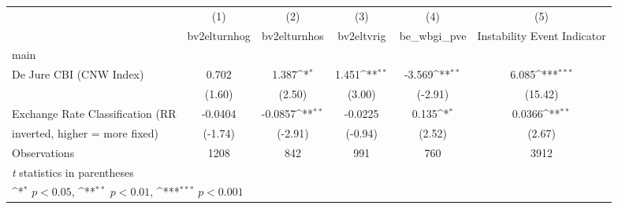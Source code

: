 {
\def\sym#1{\ifmmode^{#1}\else\(^{#1}\)\fi}
\begin{tabular}{l*{5}{c}}
\toprule
                                        &\multicolumn{1}{c}{(1)}&\multicolumn{1}{c}{(2)}&\multicolumn{1}{c}{(3)}&\multicolumn{1}{c}{(4)}&\multicolumn{1}{c}{(5)}\\
                                        &\multicolumn{1}{c}{bv2elturnhog}&\multicolumn{1}{c}{bv2elturnhos}&\multicolumn{1}{c}{bv2eltvrig}&\multicolumn{1}{c}{be\_wbgi\_pve}&\multicolumn{1}{c}{Instability Event Indicator}\\
\midrule
main                                    &              &              &              &              &              \\
De Jure CBI (CNW Index)                 &0.702         &1.387\sym{*}  &1.451\sym{**} &-3.569\sym{**} &6.085\sym{***}\\
                                        &(1.60)         &(2.50)         &(3.00)         &(-2.91)         &(15.42)         \\
\addlinespace
Exchange Rate Classification (RR        &-0.0404         &-0.0857\sym{**} &-0.0225         &0.135\sym{*}  &0.0366\sym{**} \\
inverted, higher = more fixed)          &(-1.74)         &(-2.91)         &(-0.94)         &(2.52)         &(2.67)         \\
\midrule
Observations                            & 1208         &  842         &  991         &  760         & 3912         \\
\bottomrule
\multicolumn{6}{l}{\footnotesize \textit{t} statistics in parentheses}\\
\multicolumn{6}{l}{\footnotesize \sym{*} \(p<0.05\), \sym{**} \(p<0.01\), \sym{***} \(p<0.001\)}\\
\end{tabular}
}
